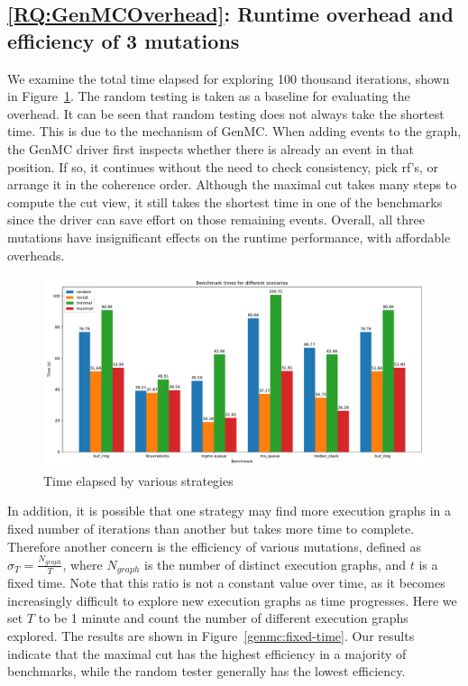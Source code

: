 \subsection{\ref*{RQ:GenMCOverhead}: Runtime overhead and efficiency of 3 mutations }

We examine the total time elapsed for exploring 100 thousand iterations, shown in Figure~\ref{genmc:overhead}. The random testing is taken as a baseline for evaluating the overhead. It can be seen that random testing does not always take the shortest time. This is due to the mechanism of GenMC. When adding events to the graph, the GenMC driver first inspects whether there is already an event in that position. If so, it continues without the need to check consistency, pick rf's, or arrange it in the coherence order. Although the maximal cut takes many steps to compute the cut view, it still takes the shortest time in one of the benchmarks since the driver can save effort on those remaining events. Overall, all three mutations have insignificant effects on the runtime performance, with affordable overheads.




\begin{figure}[h!tbp]
	\centering
	\includegraphics[scale=0.37]{figure/genmc/overhead.pdf}
	\caption{Time elapsed by various strategies}
	\label{genmc:overhead}
\end{figure}

In addition, it is possible that one strategy may find more execution graphs in a fixed number of iterations than another but takes more time to complete. Therefore another concern is the efficiency of various mutations, defined as $\sigma_T = \frac{N_{graph}}{T}$, where $N_{graph}$ is the number of distinct execution graphs, and $t$ is a fixed time. Note that this ratio is not a constant value over time, as it becomes increasingly difficult to explore new execution graphs as time progresses. Here we set $T$ to be 1 minute and count the number of different execution graphs explored. The results are shown in Figure~\ref{genmc:fixed-time}. Our results indicate that the maximal cut has the highest efficiency in a majority of benchmarks, while the random tester generally has the lowest efficiency.



